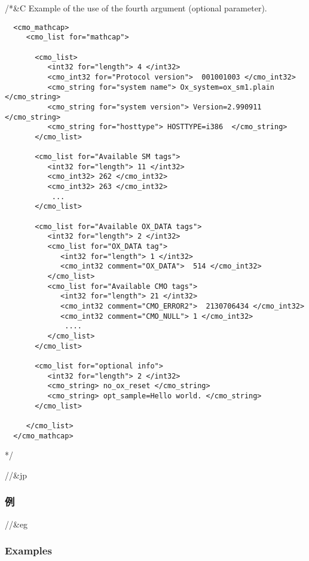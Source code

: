 /*&C
\noindent
Example of the use of the fourth argument (optional parameter).
\begin{verbatim}
  <cmo_mathcap>
     <cmo_list for="mathcap">

       <cmo_list>
          <int32 for="length"> 4 </int32>
          <cmo_int32 for="Protocol version">  001001003 </cmo_int32>
          <cmo_string for="system name"> Ox_system=ox_sm1.plain  </cmo_string>
          <cmo_string for="system version"> Version=2.990911  </cmo_string>
          <cmo_string for="hosttype"> HOSTTYPE=i386  </cmo_string>
       </cmo_list>

       <cmo_list for="Available SM tags">
          <int32 for="length"> 11 </int32>
          <cmo_int32> 262 </cmo_int32> 
          <cmo_int32> 263 </cmo_int32> 
           ...
       </cmo_list>

       <cmo_list for="Available OX_DATA tags">
          <int32 for="length"> 2 </int32>
          <cmo_list for="OX_DATA tag">
             <int32 for="length"> 1 </int32>
             <cmo_int32 comment="OX_DATA">  514 </cmo_int32>
          </cmo_list>
          <cmo_list for="Available CMO tags">
             <int32 for="length"> 21 </int32>
             <cmo_int32 comment="CMO_ERROR2">  2130706434 </cmo_int32>
             <cmo_int32 comment="CMO_NULL"> 1 </cmo_int32>
              ....
          </cmo_list>
       </cmo_list>

       <cmo_list for="optional info">
          <int32 for="length"> 2 </int32>
          <cmo_string> no_ox_reset </cmo_string>
          <cmo_string> opt_sample=Hello world. </cmo_string>
       </cmo_list>

     </cmo_list>
  </cmo_mathcap>
\end{verbatim}
*/

\medbreak

//&jp \subsubsection{ 例 }
//&eg \subsubsection{ Examples }

